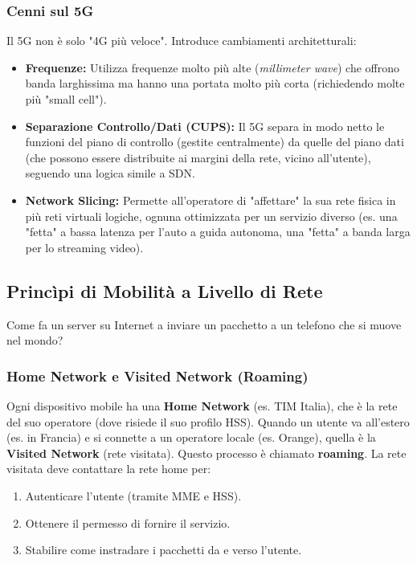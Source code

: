 \subsubsection{Cenni sul 5G}
Il 5G non è solo "4G più veloce". Introduce cambiamenti architetturali:
\begin{itemize}
    \item \textbf{Frequenze:} Utilizza frequenze molto più alte (\textit{millimeter wave}) che offrono banda larghissima ma hanno una portata molto più corta (richiedendo molte più "small cell").
    \item \textbf{Separazione Controllo/Dati (CUPS):} Il 5G separa in modo netto le funzioni del piano di controllo (gestite centralmente) da quelle del piano dati (che possono essere distribuite ai margini della rete, vicino all'utente), seguendo una logica simile a SDN.
    \item \textbf{Network Slicing:} Permette all'operatore di "affettare" la sua rete fisica in più reti virtuali logiche, ognuna ottimizzata per un servizio diverso (es. una "fetta" a bassa latenza per l'auto a guida autonoma, una "fetta" a banda larga per lo streaming video).
\end{itemize}

\subsection{Princìpi di Mobilità a Livello di Rete}
Come fa un server su Internet a inviare un pacchetto a un telefono che si muove nel mondo?

\subsubsection{Home Network e Visited Network (Roaming)}
Ogni dispositivo mobile ha una \textbf{Home Network} (es. TIM Italia), che è la rete del suo operatore (dove risiede il suo profilo HSS).
Quando un utente va all'estero (es. in Francia) e si connette a un operatore locale (es. Orange), quella è la \textbf{Visited Network} (rete visitata). Questo processo è chiamato \textbf{roaming}.
La rete visitata deve contattare la rete home per:
\begin{enumerate}
    \item Autenticare l'utente (tramite MME e HSS).
    \item Ottenere il permesso di fornire il servizio.
    \item Stabilire come instradare i pacchetti da e verso l'utente.
\end{enumerate}

